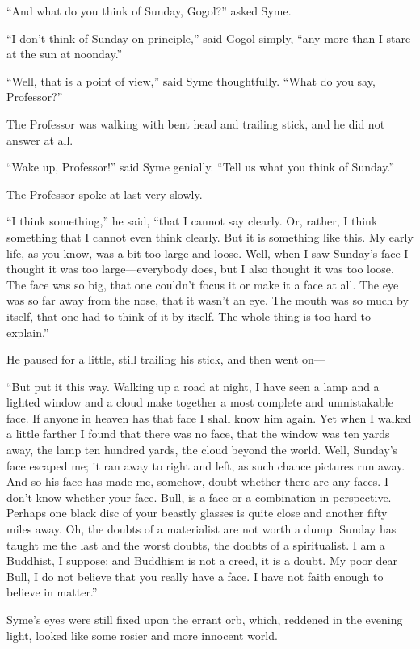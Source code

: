 \documentclass{book}
\begin{document}
“And what do you think of Sunday, Gogol?” asked Syme.

“I don’t think of Sunday on principle,” said Gogol simply, “any more than I stare at the sun at noonday.”

“Well, that is a point of view,” said Syme thoughtfully. “What do you say, Professor?”

The Professor was walking with bent head and trailing stick, and he did not answer at all.

“Wake up, Professor!” said Syme genially. “Tell us what you think of Sunday.”

The Professor spoke at last very slowly.

“I think something,” he said, “that I cannot say clearly. Or, rather, I think something that I cannot even think clearly. But it is something like this. My early life, as you know, was a bit too large and loose. Well, when I saw Sunday’s face I thought it was too large—everybody does, but I also thought it was too loose. The face was so big, that one couldn’t focus it or make it a face at all. The eye was so far away from the nose, that it wasn’t an eye. The mouth was so much by itself, that one had to think of it by itself. The whole thing is too hard to explain.”

He paused for a little, still trailing his stick, and then went on—

“But put it this way. Walking up a road at night, I have seen a lamp and a lighted window and a cloud make together a most complete and unmistakable face. If anyone in heaven has that face I shall know him again. Yet when I walked a little farther I found that there was no face, that the window was ten yards away, the lamp ten hundred yards, the cloud beyond the world. Well, Sunday’s face escaped me; it ran away to right and left, as such chance pictures run away. And so his face has made me, somehow, doubt whether there are any faces. I don’t know whether your face. Bull, is a face or a combination in perspective. Perhaps one black disc of your beastly glasses is quite close and another fifty miles away. Oh, the doubts of a materialist are not worth a dump. Sunday has taught me the last and the worst doubts, the doubts of a spiritualist. I am a Buddhist, I suppose; and Buddhism is not a creed, it is a doubt. My poor dear Bull, I do not believe that you really have a face. I have not faith enough to believe in matter.”

Syme’s eyes were still fixed upon the errant orb, which, reddened in the evening light, looked like some rosier and more innocent world.
\end{document}
